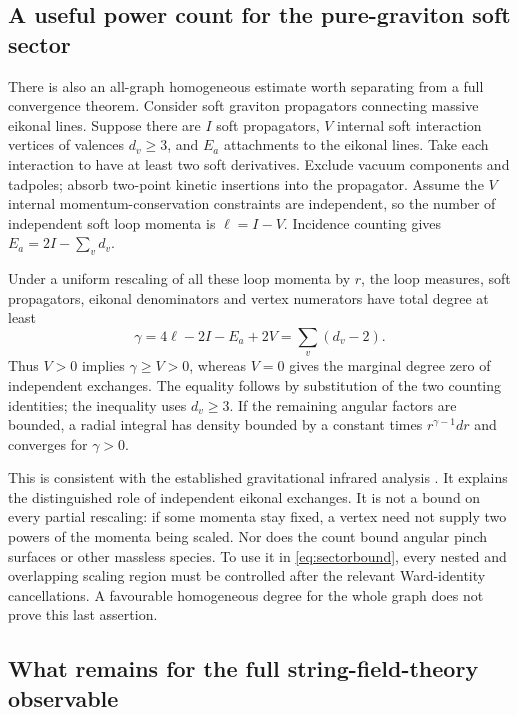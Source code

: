 \subsection{A useful power count for the pure-graviton soft sector}

There is also an all-graph homogeneous estimate worth separating from a full convergence theorem. Consider soft graviton propagators connecting massive eikonal lines. Suppose there are $I$ soft propagators, $V$ internal soft interaction vertices of valences $d_v\ge3$, and $E_a$ attachments to the eikonal lines. Take each interaction to have at least two soft derivatives. Exclude vacuum components and tadpoles; absorb two-point kinetic insertions into the propagator. Assume the $V$ internal momentum-conservation constraints are independent, so the number of independent soft loop momenta is $\ell=I-V$. Incidence counting gives $E_a=2I-\sum_vd_v$.

Under a uniform rescaling of all these loop momenta by $r$, the loop measures, soft propagators, eikonal denominators and vertex numerators have total degree at least
\begin{equation}\label{eq:gravdegree}
 \gamma=4\ell-2I-E_a+2V
        =\sum_v(d_v-2).
\end{equation}
Thus $V>0$ implies $\gamma\ge V>0$, whereas $V=0$ gives the marginal degree zero of independent exchanges. The equality follows by substitution of the two counting identities; the inequality uses $d_v\ge3$. If the remaining angular factors are bounded, a radial integral has density bounded by a constant times $r^{\gamma-1}dr$ and converges for $\gamma>0$.

This is consistent with the established gravitational infrared analysis \cite{ASS11}. It explains the distinguished role of independent eikonal exchanges. It is not a bound on every partial rescaling: if some momenta stay fixed, a vertex need not supply two powers of the momenta being scaled. Nor does the count bound angular pinch surfaces or other massless species. To use it in \eqref{eq:sectorbound}, every nested and overlapping scaling region must be controlled after the relevant Ward-identity cancellations. A favourable homogeneous degree for the whole graph does not prove this last assertion.

\subsection{What remains for the full string-field-theory observable}

